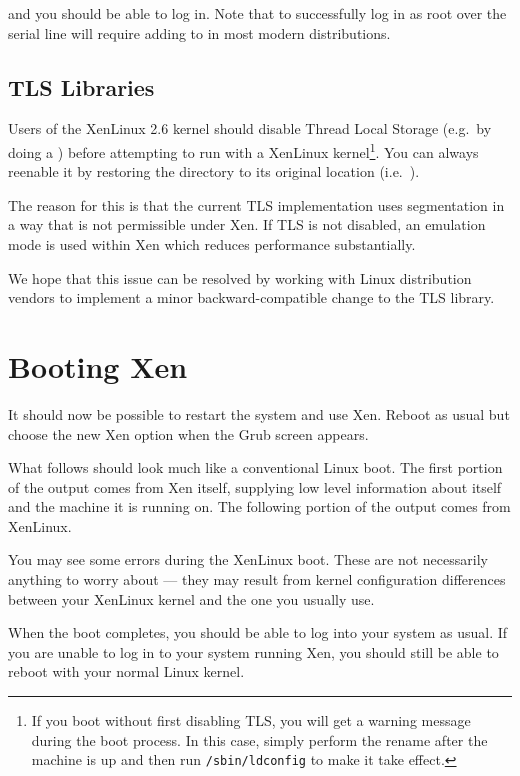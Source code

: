 \documentclass[11pt,twoside,final,openright]{report}
\begin{document}
and you should be able to log in. Note that to successfully log in 
as root over the serial line will require adding  to
 in most modern distributions. 

\subsection{TLS Libraries}

Users of the XenLinux 2.6 kernel should disable Thread Local Storage
(e.g.\ by doing a ) before
attempting to run with a XenLinux kernel\footnote{If you boot without first
disabling TLS, you will get a warning message during the boot
process. In this case, simply perform the rename after the machine is
up and then run \texttt{/sbin/ldconfig} to make it take effect.}.  You can
always reenable it by restoring the directory to its original location
(i.e.\ ).

The reason for this is that the current TLS implementation uses
segmentation in a way that is not permissible under Xen.  If TLS is
not disabled, an emulation mode is used within Xen which reduces
performance substantially.

We hope that this issue can be resolved by working with Linux
distribution vendors to implement a minor backward-compatible change
to the TLS library.

\section{Booting Xen} 

It should now be possible to restart the system and use Xen.  Reboot
as usual but choose the new Xen option when the Grub screen appears.

What follows should look much like a conventional Linux boot.  The
first portion of the output comes from Xen itself, supplying low level
information about itself and the machine it is running on.  The
following portion of the output comes from XenLinux.

You may see some errors during the XenLinux boot.  These are not
necessarily anything to worry about --- they may result from kernel
configuration differences between your XenLinux kernel and the one you
usually use.

When the boot completes, you should be able to log into your system as
usual.  If you are unable to log in to your system running Xen, you
should still be able to reboot with your normal Linux kernel.
\end{document}

